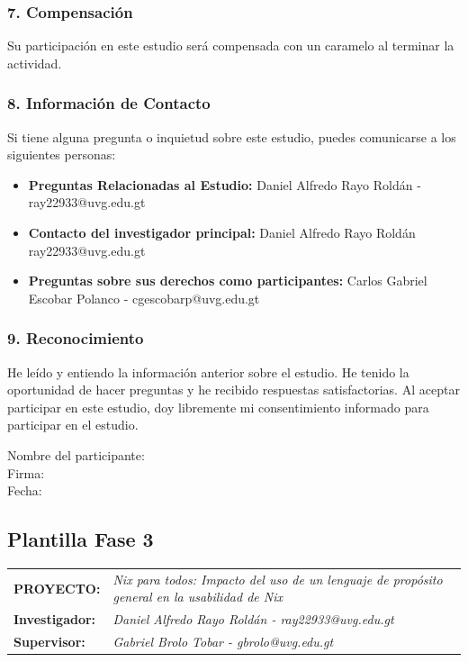 \subsubsection{7. Compensación}

\vspace{0.3em}

Su participación en este estudio será compensada con un caramelo al terminar la actividad.

\subsubsection{8. Información de Contacto}

Si tiene alguna pregunta o inquietud sobre este estudio, puedes comunicarse a los siguientes personas:

\begin{itemize}
\item \textbf{Preguntas Relacionadas al Estudio:} Daniel Alfredo Rayo Roldán - ray22933@uvg.edu.gt
\item \textbf{Contacto del investigador principal:} Daniel Alfredo Rayo Roldán ray22933@uvg.edu.gt
\item \textbf{Preguntas sobre sus derechos como participantes:} Carlos Gabriel Escobar Polanco - cgescobarp@uvg.edu.gt
\end{itemize}

\subsubsection{9. Reconocimiento}

He leído y entiendo la información anterior sobre el estudio. He tenido la oportunidad de hacer
preguntas y he recibido respuestas satisfactorias. Al aceptar participar en este estudio, doy
libremente mi consentimiento informado para participar en el estudio.

\vspace{2em}

\noindent
Nombre del participante: \lineafirma \\[1.8em]
Firma: \lineafirma \\[1.8em]
Fecha: \lineafirma

\subsection{Plantilla Fase 3}

\noindent
\begin{tabularx}{\linewidth}{@{}lX@{}}
\textbf{PROYECTO:} & \emph{Nix para todos: Impacto del uso de un lenguaje de propósito general en la usabilidad de Nix} \\[0.35em]
\textbf{Investigador:} & \emph{Daniel Alfredo Rayo Roldán - ray22933@uvg.edu.gt} \\[0.35em]
\textbf{Supervisor:} & \emph{Gabriel Brolo Tobar - gbrolo@uvg.edu.gt} \\
\end{tabularx}

